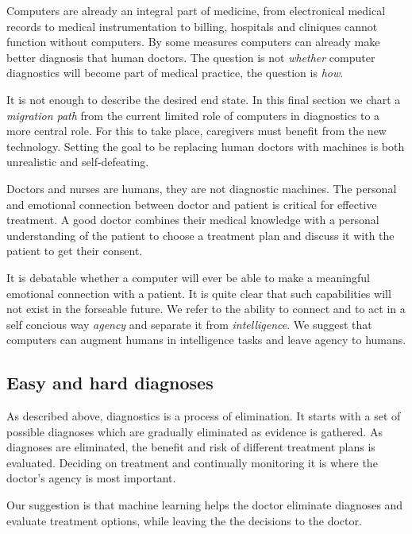 \documentclass[9pt,twocolumn,twoside]{pnas-new}
\begin{document}
  Computers are already an integral part of medicine, from
  electronical medical records to medical instrumentation to billing,
  hospitals and cliniques cannot function without computers. By some
  measures computers can already make better diagnosis that human
  doctors. The question is not {\em whether} computer diagnostics will
  become part of medical practice, the question is {\em how}.

  It is not enough to describe the desired end state. 
  In this final section we chart a {\em migration path} from the
  current limited role of computers in diagnostics to a
  more central role. For this to take place, caregivers must benefit
  from the new technology. Setting the goal to be replacing human
  doctors with machines is both unrealistic and self-defeating.

  Doctors and nurses are humans, they are not diagnostic machines. The
  personal and emotional connection between doctor and patient is
  critical for effective treatment. A good doctor combines their
  medical knowledge with a personal understanding of the patient to
  choose a treatment plan and discuss it with the patient to get their
  consent.

  It is debatable whether a computer will ever be able to
  make a meaningful emotional connection with a patient. It is quite
  clear that such capabilities will not exist in the forseable future.
  We refer to the ability to connect and to act in a self concious
  way {\em agency} and separate it from {\em intelligence}. We suggest
  that computers can augment humans in intelligence tasks and leave
  agency to humans.

  \subsection*{Easy and hard diagnoses}

  As described above, diagnostics is a process of elimination. It
  starts with a set of possible diagnoses which are gradually
  eliminated as evidence is  gathered. As diagnoses are
  eliminated, the benefit and risk of different treatment plans is evaluated.
  Deciding on treatment and continually monitoring it is where the
  doctor's agency is most important.

  Our suggestion is that machine learning helps the doctor eliminate
  diagnoses and evaluate treatment options, while leaving the the
  decisions to the doctor.
\end{document}
